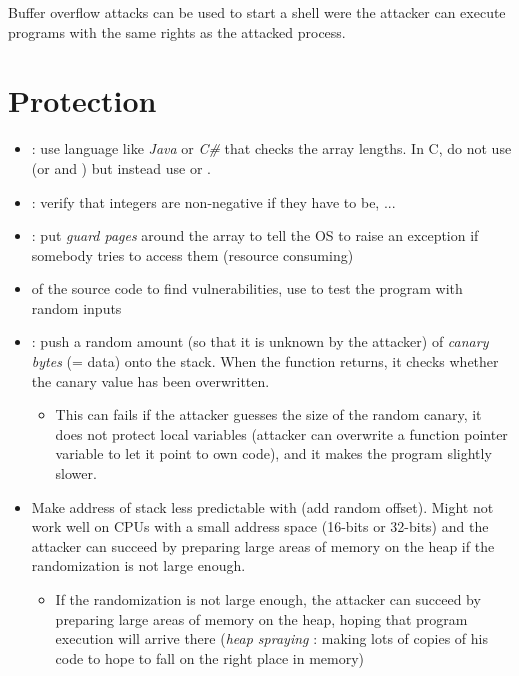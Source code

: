 Buffer overflow attacks can be used to start a shell were the attacker can execute programs with the same rights as the attacked process.

\section{Protection}

\begin{itemize}
    \item {} : use language like \textit{Java} or \textit{C\#} that checks the array lengths. In C, do not use  (or  and ) but instead use  or .
    \item {} : verify that integers are non-negative if they have to be, ...
    \item {} : put \textit{guard pages} around the array to tell the OS to raise an exception if somebody tries to access them (resource consuming)
    \item {} of the source code to find vulnerabilities, use  to test the program with random inputs
    \item {} : push a random amount (so that it is unknown by the attacker) of \textit{canary bytes} (= data) onto the stack. When the function returns, it checks whether the canary value has been overwritten.
        \begin{itemize}
            \item This can fails if the attacker guesses the size of the random canary, it does not protect local variables (attacker can overwrite a function pointer variable to let it point to own code), and it makes the program slightly slower.
        \end{itemize}
    \item Make address of stack less predictable with  (add random offset). Might not work well on CPUs with a small address space (16-bits or 32-bits) and the attacker can succeed by preparing large areas of memory on the heap if the randomization is not large enough.
        \begin{itemize}
            \item If the randomization is not large enough, the attacker can succeed by preparing large areas of memory on the heap, hoping that program execution will arrive there (\textit{heap spraying} : making lots of copies of his code to hope to fall on the right place in memory)

\end{itemize}
\end{itemize}
